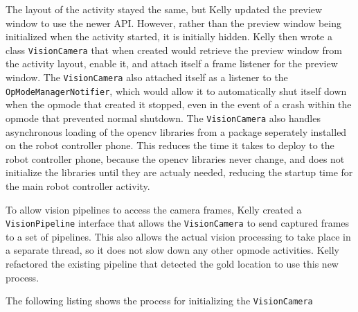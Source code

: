 \documentclass{article}
\begin{document}
The layout of the activity stayed the same, but Kelly updated the preview window to use the newer API. However, rather than the preview window being initialized when the activity started, it is initially hidden. Kelly then wrote a class \texttt{VisionCamera} that when created would retrieve the preview window from the activity layout, enable it, and attach itself a frame listener for the preview window. The  \texttt{VisionCamera} also attached itself as a listener to the \texttt{OpModeManagerNotifier}, which would allow it to automatically shut itself down when the opmode that created it stopped, even in the event of a crash within the opmode that prevented normal shutdown. The \texttt{VisionCamera} also handles asynchronous loading of the opencv libraries from a package seperately installed on the robot controller phone. This reduces the time it takes to deploy to the robot controller phone, because the opencv libraries never change, and does not initialize the libraries until they are actualy needed, reducing the startup time for the main robot controller activity. 

To allow vision pipelines to access the camera frames, Kelly created a \texttt{VisionPipeline} interface that allows the \texttt{VisionCamera} to send captured frames to a set of pipelines. This also allows the actual vision processing to take place in a separate thread, so it does not slow down any other opmode activities. Kelly refactored the existing pipeline that detected the gold location to use this new process. 

The following listing shows the process for initializing the \texttt{VisionCamera}
\end{document}

